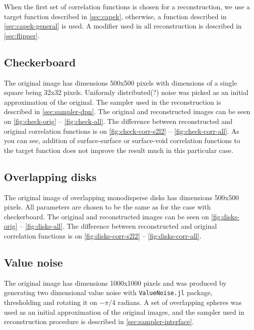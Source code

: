 \documentclass[preprint,amsmath,amssymb,aps,pre]{revtex4-1}
\begin{document}
When the first set of correlation functions is chosen for a reconstruction, we
use a target function described in \cref{sec:capek}, otherwise, a function
described in \cref{sec:capek-general} is used. A modifier used in all
reconstruction is described in \cref{sec:flipper}.

\subsection{Checkerboard}
The original image has dimensions 500x500 pixels with dimensions of a single
square being 32x32 pixels. Uniformly distributed(?) noise was picked as an
initial approximation of the original. The sampler used in the reconstruction is
described in \cref{sec:sampler-dpn}. The original and reconstructed images can
be seen on \cref{fig:check-orig} -- \cref{fig:check-all}. The difference between
reconstructed and original correlation functions is on
\cref{fig:check-corr-s2l2} -- \cref{fig:check-corr-all}. As you can see,
addition of surface-surface or surface-void correlation functions to the target
function does not improve the result much in this particular case.

\subsection{Overlapping disks}
The original image of overlapping monodisperse disks has dimensions 500x500
pixels. All parameters are chosen to be the same as for the case with
checkerboard. The original and reconstructed images can be seen on
\cref{fig:disks-orig} -- \cref{fig:disks-all}. The difference between
reconstructed and original correlation functions is on
\cref{fig:disks-corr-s2l2} -- \cref{fig:disks-corr-all}.

\subsection{Value noise}
The original image has dimensions 1000x1000 pixels and was produced by
generating two dimensional value noise with \verb+ValueNoise.jl+ package,
thresholding and rotating it on $-\pi/4$ radians. A set of overlapping spheres
was used as an initial approximation of the original images, and the sampler
used in reconstruction procedure is described in \cref{sec:sampler-interface}.
\end{document}
